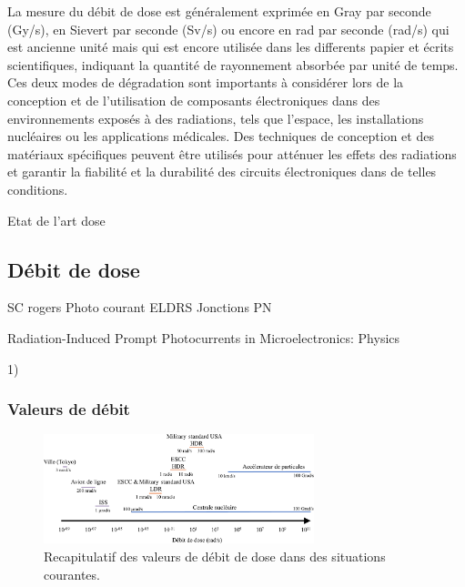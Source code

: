 La mesure du débit de dose est généralement exprimée en Gray par seconde (Gy/s), en Sievert par seconde (Sv/s) ou encore en rad par seconde (rad/s) qui est ancienne unité mais qui est encore utilisée dans les differents papier et écrits scientifiques, indiquant la quantité de rayonnement absorbée par unité de temps.
Ces deux modes de dégradation sont importants à considérer lors de la conception et de l'utilisation de composants électroniques dans des environnements exposés à des radiations, tels que l'espace, les installations nucléaires ou les applications médicales. Des techniques de conception et des matériaux spécifiques peuvent être utilisés pour atténuer les effets des radiations et garantir la fiabilité et la durabilité des circuits électroniques dans de telles conditions.

\begin{metsUneSource}
  Etat de l’art dose
\end{metsUneSource} 


\subsection{Débit de dose}

\begin{metsUneSource}
SC rogers
Photo courant
ELDRS
Jonctions PN

Radiation-Induced Prompt Photocurrents in Microelectronics: Physics
\end{metsUneSource}

\begin{metsUneSource}
 1) 
\end{metsUneSource}
           
\subsubsection{ Valeurs de débit}

\begin{figure}[H]
  \centering
  \includegraphics[width=0.7\textwidth]{figures/DoseRateExemple.pdf}
  \caption{Recapitulatif des valeurs de débit de dose dans des situations courantes.}
  \label{fig:DoseRateExemple}
\end{figure}

